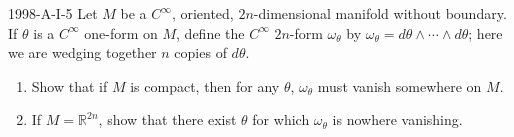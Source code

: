 \documentclass{article}
\begin{document}
	\begin{prb}{1998-A-I-5}
		Let $M$ be a $C^\infty$, oriented, $2n$-dimensional manifold without boundary. If $\theta$ is a $C^\infty$ one-form on $M$, define the $C^\infty$ $2n$-form $\omega_\theta$ by $\omega_\theta = d\theta \wedge \dotsm \wedge d\theta$; here we are wedging together $n$ copies of $d\theta$. \vspace{-0.25cm}
		\begin{enumerate}[itemsep =-2pt,label = (\alph{*})]
			\item Show that if $M$ is compact, then for any $\theta$, $\omega_\theta$ must vanish somewhere on $M$. 
			\item If $M = \mathbb{R}^{2n}$, show that there exist $\theta$ for which $\omega_\theta$ is nowhere vanishing. 
		\end{enumerate}
	\end{prb}
\end{document}
